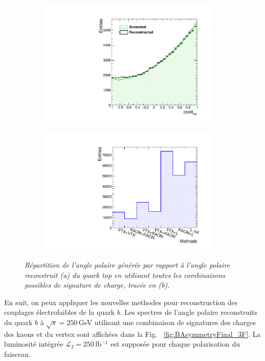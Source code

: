 \begin{figure}
	\centering
	\begin{subfigure}{0.5\textwidth}
		\includegraphics[width=0.95\textwidth]{ILD/plots/top-asymmetry-lepton.pdf}
		\caption{\label{fig:TopAsymmetryChi_a_3F} }
	\end{subfigure}%
	\begin{subfigure}{0.5\textwidth}
		\centering
		\includegraphics[width=0.95\textwidth]{ILD/plots/top-methods-lepton.pdf}
		\caption{\label{fig:TopAsymmetryChi_b_3F} }
	\end{subfigure}
	\caption{\sl Répartition de l'angle polaire générée par rapport à l'angle polaire reconstruit (a) du quark top en utilisant toutes les combinaisons possibles de signature de charge, tracée en (b).}
	\label{fig:TopAsymmetryChi_3F}
\end{figure}

En suit, on peux appliquer les nouvelles methodes pour reconstruction des couplages \'electrofaibles de la quark $b$. 
Les spectres de l'angle polaire reconstruits du quark $b$ à $\sqrt{s} = 250$\,GeV utilisant une combinaison de signatures des charges des kaons et du vertex sont affich\`ees dans la Fig. ~\ref{fig:BAsymmetryFinal_3F}. La luminosité intégrée $\mathcal{L}_I=250$\,fb$^{-1}$ est supposée pour chaque polarisation du faisceau.

